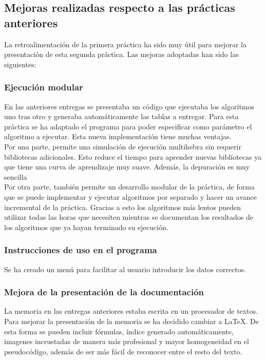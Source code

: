 \documentclass[12pt, spanish]{article}
\begin{document}
\subsection{Mejoras realizadas respecto a las prácticas anteriores}
La retroalimentación de la primera práctica ha sido muy útil para mejorar la presentación de esta segunda práctica. Las mejoras adoptadas han sido las siguientes:\\
\subsubsection{Ejecución modular}
En las anteriores entregas se presentaba un código que ejecutaba los algoritmos uno tras otro y generaba automáticamente las tablas a entregar. Para esta práctica se ha adaptado el programa para poder especificar como parámetro el algoritmo a ejecutar. Esta nueva implementación tiene muchas ventajas. \\
Por una parte, permite una simulación de ejecución multihebra sin requerir bibliotecas adicionales. Esto reduce el tiempo para aprender nuevas bibliotecas ya que tiene una curva de aprendizaje muy suave. Además, la depuración es muy sencilla  \\
Por otra parte, también permite un desarrollo modular de la práctica, de forma que se puede implementar y ejecutar algoritmos por separado y hacer un avance incremental de la práctica. Gracias a esto los algoritmos más lentos pueden utilizar todas las horas que necesiten mientras se documentan los resultados de los algoritmos que ya hayan terminado su ejecución. \\ 
\subsubsection{Instrucciones de uso en el programa}
Se ha creado un menú para facilitar al usuario introducir los datos correctos. 
\subsubsection{Mejora de la presentación de la documentación}
La memoria en las entregas anteriores estaba escrita en un procesador de textos. Para mejorar la presentación de la memoria se ha decidido cambiar a LaTeX. De esta forma se pueden incluir fórmulas, índice generado automáticamente, imagenes incrustadas de manera más profesional y mayor homogeneidad en el pseudocódigo, además de ser más fácil de reconocer entre el resto del texto. \\
\end{document}
